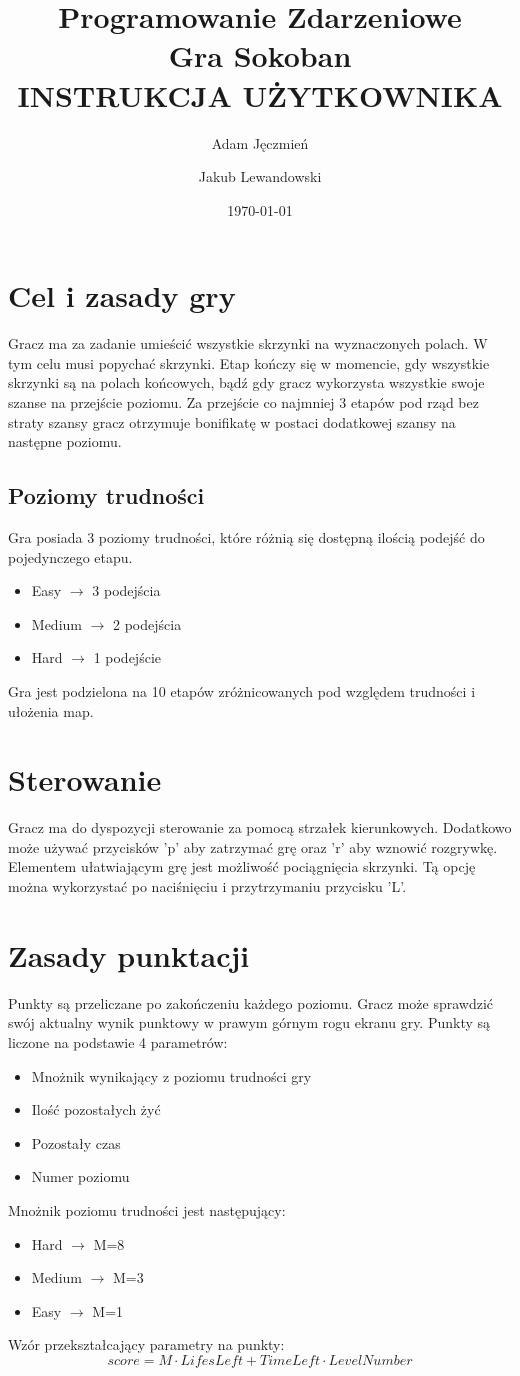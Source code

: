 \documentclass[a4paper]{article}
\title{Programowanie Zdarzeniowe\\
		Gra Sokoban\\
		INSTRUKCJA UŻYTKOWNIKA}
\author{Adam Jęczmień
		\and
		Jakub Lewandowski}
\date{\today}
\begin{document}
\maketitle
\newpage
\section{Cel i zasady gry}
Gracz ma za zadanie umieścić wszystkie skrzynki na wyznaczonych polach. W tym celu musi popychać skrzynki. Etap kończy się w momencie, gdy wszystkie skrzynki są na polach końcowych, bądź gdy gracz wykorzysta wszystkie swoje szanse na przejście poziomu. Za przejście co najmniej 3 etapów pod rząd bez straty szansy gracz otrzymuje bonifikatę w postaci dodatkowej szansy na następne poziomu.
\subsection{Poziomy trudności}
Gra posiada 3 poziomy trudności, które różnią się dostępną ilością podejść do pojedynczego etapu.
\begin{itemize}
\item Easy $\rightarrow$ 3 podejścia
\item Medium $\rightarrow$ 2 podejścia
\item Hard $\rightarrow$ 1 podejście
\end{itemize}
Gra jest podzielona na 10 etapów zróżnicowanych pod względem trudności i ułożenia map.
\section{Sterowanie}
Gracz ma do dyspozycji sterowanie za pomocą strzałek kierunkowych. Dodatkowo może używać przycisków 'p' aby zatrzymać grę oraz 'r' aby wznowić rozgrywkę. Elementem ułatwiającym grę jest możliwość pociągnięcia skrzynki. Tą opcję można wykorzystać po naciśnięciu i przytrzymaniu przycisku 'L'.

\section{Zasady punktacji}
Punkty są przeliczane po zakończeniu każdego poziomu. Gracz może sprawdzić swój aktualny wynik punktowy w prawym górnym rogu ekranu gry. Punkty są liczone na podstawie 4 parametrów:
\begin{itemize}
\item Mnożnik wynikający z poziomu trudności gry
\item Ilość pozostałych żyć
\item Pozostały czas
\item Numer poziomu
\end{itemize}
Mnożnik poziomu trudności jest następujący:
\begin{itemize}
\item Hard $\rightarrow$ M=8
\item Medium $\rightarrow$ M=3
\item Easy $\rightarrow$ M=1
\end{itemize}
Wzór przekształcający parametry na punkty:
\begin{equation}
score = M\cdot LifesLeft + TimeLeft \cdot LevelNumber
\end{equation}
\end{document}

